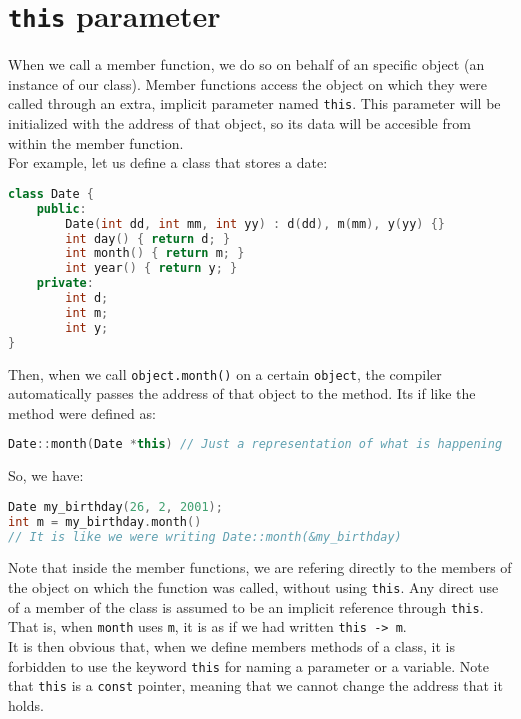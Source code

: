 \section{\texttt{this} parameter}

When we call a member function, we do so on behalf of an specific object (an instance
of our class). Member functions access the object on which they were called through
an extra, implicit parameter named \texttt{this}. This parameter will be initialized
with the address of that object, so its data will be accesible from within the member
function.\\

For example, let us define a class that stores a date:\\

\begin{lstlisting}[language=C++]
class Date {
    public:
        Date(int dd, int mm, int yy) : d(dd), m(mm), y(yy) {}
        int day() { return d; }
        int month() { return m; }
        int year() { return y; }
    private:
        int d;
        int m;
        int y;
}
\end{lstlisting}

Then, when we call \texttt{object.month()} on a certain \texttt{object}, the compiler
automatically passes the address of that object to the method. Its if like the method 
were defined as:\\

\begin{lstlisting}[language=C++]
Date::month(Date *this) // Just a representation of what is happening
\end{lstlisting}

So, we have:

\begin{lstlisting}[language=C++]
Date my_birthday(26, 2, 2001);
int m = my_birthday.month()
// It is like we were writing Date::month(&my_birthday)
\end{lstlisting}

Note that inside the member functions, we are refering directly to the members of
the object on which the function was called, without using \texttt{this}.
Any direct use of a member of the class is assumed to be an implicit reference through
\texttt{this}. That is, when \texttt{month} uses \texttt{m}, it is as if we had
written \texttt{this -> m}.\\

It is then obvious that, when we define members methods of a class, it is forbidden to
use the keyword \texttt{this} for naming a parameter or a variable. Note that \texttt{this}
is a \texttt{const} pointer, meaning that we cannot change the address that it holds.

